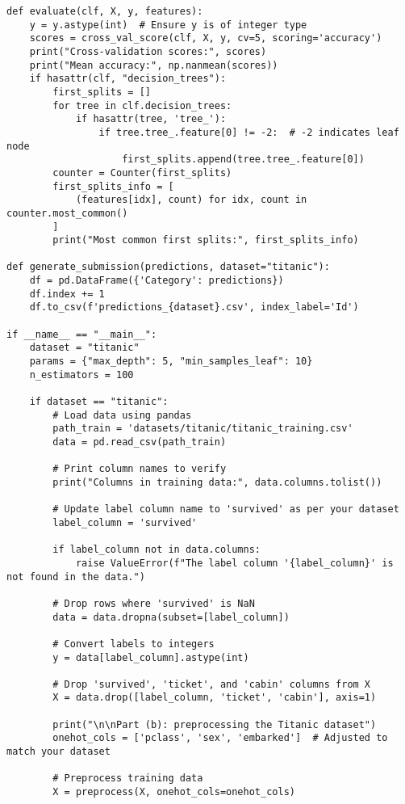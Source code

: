 \documentclass{article}
\begin{document}
\begin{enumerate}
\begin{verbatim}
def evaluate(clf, X, y, features):
    y = y.astype(int)  # Ensure y is of integer type
    scores = cross_val_score(clf, X, y, cv=5, scoring='accuracy')
    print("Cross-validation scores:", scores)
    print("Mean accuracy:", np.nanmean(scores))
    if hasattr(clf, "decision_trees"):
        first_splits = []
        for tree in clf.decision_trees:
            if hasattr(tree, 'tree_'):
                if tree.tree_.feature[0] != -2:  # -2 indicates leaf node
                    first_splits.append(tree.tree_.feature[0])
        counter = Counter(first_splits)
        first_splits_info = [
            (features[idx], count) for idx, count in counter.most_common()
        ]
        print("Most common first splits:", first_splits_info)

def generate_submission(predictions, dataset="titanic"):
    df = pd.DataFrame({'Category': predictions})
    df.index += 1
    df.to_csv(f'predictions_{dataset}.csv', index_label='Id')

if __name__ == "__main__":
    dataset = "titanic"
    params = {"max_depth": 5, "min_samples_leaf": 10}
    n_estimators = 100

    if dataset == "titanic":
        # Load data using pandas
        path_train = 'datasets/titanic/titanic_training.csv'
        data = pd.read_csv(path_train)

        # Print column names to verify
        print("Columns in training data:", data.columns.tolist())

        # Update label column name to 'survived' as per your dataset
        label_column = 'survived'

        if label_column not in data.columns:
            raise ValueError(f"The label column '{label_column}' is not found in the data.")

        # Drop rows where 'survived' is NaN
        data = data.dropna(subset=[label_column])

        # Convert labels to integers
        y = data[label_column].astype(int)

        # Drop 'survived', 'ticket', and 'cabin' columns from X
        X = data.drop([label_column, 'ticket', 'cabin'], axis=1)

        print("\n\nPart (b): preprocessing the Titanic dataset")
        onehot_cols = ['pclass', 'sex', 'embarked']  # Adjusted to match your dataset

        # Preprocess training data
        X = preprocess(X, onehot_cols=onehot_cols)


\end{verbatim}
\end{enumerate}
\end{document}
